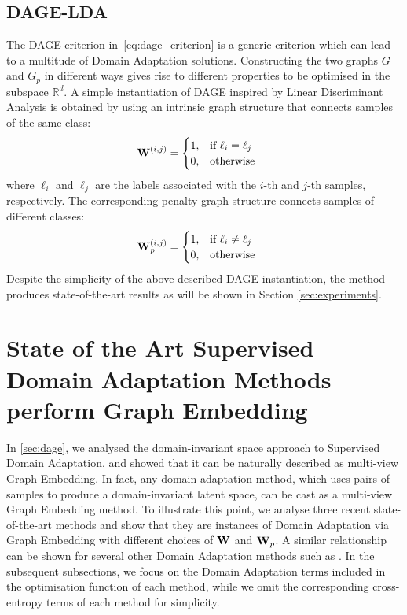 \documentclass[journal]{IEEEtran}
\renewcommand{\matrix}[1]{\ensuremath{\bm{\mathbf{\uppercase{#1}}}}}
\newcommand{\mW}{\matrix{W}}
\begin{document}
\subsection{DAGE-LDA} \label{sec:dage-lda}
The DAGE criterion in~\cref{eq:dage_criterion} is a generic criterion which can lead to a multitude of Domain Adaptation solutions. Constructing the two graphs $G$ and $G_p$ in different ways gives rise to different properties to be optimised in the subspace $\mathbb{R}^d$. A simple instantiation of DAGE inspired by Linear Discriminant Analysis is obtained by using an intrinsic graph structure that connects samples of the same class:
\begin{align}
    \matrix{W}^{(i,j)} &= 
        \begin{cases}
            1, & \text{if } \ell_i = \ell_j \\
            0, & \text{otherwise } \\
        \end{cases} 
\label{eq:dage_lda_intrinsic_graph_structure}
\end{align}
where $\ell_i$ and $\ell_j$ are the labels associated with the $i$-th and $j$-th samples, respectively. The corresponding penalty graph structure connects samples of different classes:
\begin{align}
    \matrix{W}_p^{(i,j)} &= 
        \begin{cases}
            1, & \text{if } \ell_i \neq \ell_j \\
            0, & \text{otherwise } \\
        \end{cases} 
\label{eq:dage_lda_penalty_graph_structure}
\end{align}
Despite the simplicity of the above-described DAGE instantiation, the method produces state-of-the-art results as will be shown in Section \ref{sec:experiments}.  


\section{State of the Art Supervised Domain Adaptation Methods perform Graph Embedding}\label{sec:sota-as-ge}
In \cref{sec:dage}, we analysed the domain-invariant space approach to Supervised Domain Adaptation, and showed that it can be naturally described as multi-view Graph Embedding. In fact, any domain adaptation method, which uses pairs of samples to produce a domain-invariant latent space, can be cast as a multi-view Graph Embedding method.
To illustrate this point, we analyse three recent state-of-the-art methods and show that they are instances of Domain Adaptation via Graph Embedding with different choices of $\mW$ and $\mW_p$. A similar relationship can be shown for several other Domain Adaptation methods such as \cite{das2018graph, koniusz2017domain}. In the subsequent subsections, we focus on the Domain Adaptation terms included in the optimisation function of each method, while we omit the corresponding cross-entropy terms of each method for simplicity.
\end{document}
